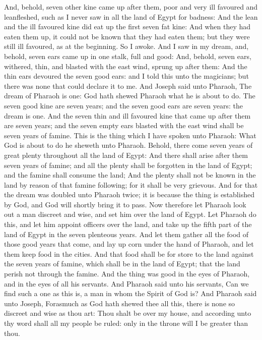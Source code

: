 \begin{biblechapter}
\verse And, behold, seven other kine came up after them, poor and very ill favoured and leanfleshed, such as I never saw in all the land of Egypt for badness:
\verse And the lean and the ill favoured kine did eat up the first seven fat kine:
\verse And when they had eaten them up, it could not be known that they had eaten them; but they were still ill favoured, as at the beginning. So I awoke.
\verse And I saw in my dream, and, behold, seven ears came up in one stalk, full and good:
\verse And, behold, seven ears, withered, thin, and blasted with the east wind, sprung up after them:
\verse And the thin ears devoured the seven good ears: and I told this unto the magicians; but there was none that could declare it to me.
\verse And Joseph said unto Pharaoh, The dream of Pharaoh is one: God hath shewed Pharaoh what he is about to do.
\verse The seven good kine are seven years; and the seven good ears are seven years: the dream is one.
\verse And the seven thin and ill favoured kine that came up after them are seven years; and the seven empty ears blasted with the east wind shall be seven years of famine.
\verse This is the thing which I have spoken unto Pharaoh: What God is about to do he sheweth unto Pharaoh.
\verse Behold, there come seven years of great plenty throughout all the land of Egypt:
\verse And there shall arise after them seven years of famine; and all the plenty shall be forgotten in the land of Egypt; and the famine shall consume the land;
\verse And the plenty shall not be known in the land by reason of that famine following; for it shall be very grievous.
\verse And for that the dream was doubled unto Pharaoh twice; it is because the thing is established by God, and God will shortly bring it to pass.
\verse Now therefore let Pharaoh look out a man discreet and wise, and set him over the land of Egypt.
\verse Let Pharaoh do this, and let him appoint officers over the land, and take up the fifth part of the land of Egypt in the seven plenteous years.
\verse And let them gather all the food of those good years that come, and lay up corn under the hand of Pharaoh, and let them keep food in the cities.
\verse And that food shall be for store to the land against the seven years of famine, which shall be in the land of Egypt; that the land perish not through the famine.
\verse And the thing was good in the eyes of Pharaoh, and in the eyes of all his servants.
\verse And Pharaoh said unto his servants, Can we find such a one as this is, a man in whom the Spirit of God is?
\verse And Pharaoh said unto Joseph, Forasmuch as God hath shewed thee all this, there is none so discreet and wise as thou art:
\verse Thou shalt be over my house, and according unto thy word shall all my people be ruled: only in the throne will I be greater than thou.

\end{biblechapter}
